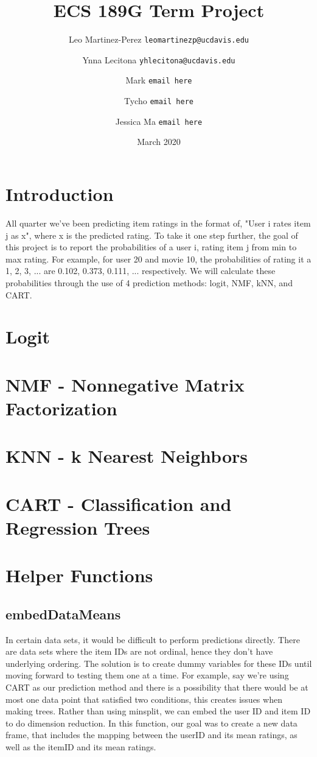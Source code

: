 \documentclass{article}
\title{ECS 189G Term Project}
\author{Leo Martinez-Perez
    \texttt{leomartinezp@ucdavis.edu}
    \and Ynna Lecitona
    \texttt{yhlecitona@ucdavis.edu}
    \and Mark
    \texttt{email here}
    \and Tycho
    \texttt{email here}
    \and Jessica Ma
    \texttt{email here}
}
\date{March 2020}
\begin{document}
\maketitle

\section{Introduction}
All quarter we've been predicting item ratings in the format of, "User i rates item j as x", where x is the predicted rating. To take it one step further, the goal of this project is to report the probabilities of a user i, rating item j from min to max rating. For example, for user 20 and movie 10, the probabilities of rating it a 1, 2, 3, ... are 0.102, 0.373, 0.111, ... respectively. We will calculate these probabilities through the use of 4 prediction methods: logit, NMF, kNN, and CART.

\section{Logit}

\section{NMF - Nonnegative Matrix Factorization}

\section{KNN - k Nearest Neighbors}

\section{CART - Classification and Regression Trees}

\section{Helper Functions}
\subsection{embedDataMeans}
In certain data sets, it would be difficult to perform predictions directly. There are data sets where the item IDs are not ordinal, hence they don't have underlying ordering. The solution is to create dummy variables for these IDs until moving forward to testing them one at a time.
For example, say we're using CART as our prediction method and there is a possibility that there would be at most one data point that satisfied two conditions, this creates issues when making trees. Rather than using minsplit, we can embed the user ID and item ID to do dimension reduction. In this function, our goal was to create a new data frame, that includes the mapping between the userID and its mean ratings, as well as the itemID and its mean ratings.
\end{document}
